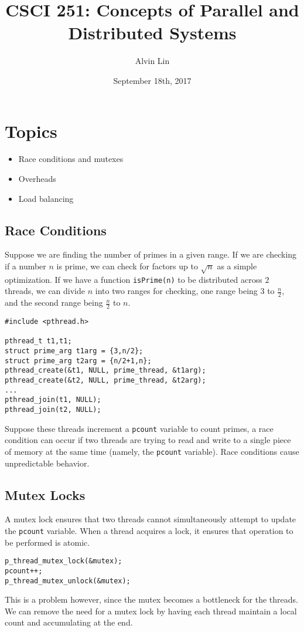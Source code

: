 \documentclass{math}
\title{CSCI 251: Concepts of Parallel and Distributed Systems}
\author{Alvin Lin}
\date{September 18th, 2017}
\begin{document}
\maketitle

\section*{Topics}
\begin{itemize}
  \item Race conditions and mutexes
  \item Overheads
  \item Load balancing
\end{itemize}

\subsection*{Race Conditions}
Suppose we are finding the number of primes in a given range. If we are
checking if a number \( n \) is prime, we can check for factors up to
\( \sqrt{n} \) as a simple optimization. If we have a function
\texttt{isPrime(n)} to be distributed across 2 threads, we can divide \( n \)
into two ranges for checking, one range being 3 to \( \frac{n}{2} \), and the
second range being \( \frac{n}{2} \) to \( n \).
\begin{lstlisting}
#include <pthread.h>

pthread_t t1,t1;
struct prime_arg t1arg = {3,n/2};
struct prime_arg t2arg = {n/2+1,n};
pthread_create(&t1, NULL, prime_thread, &t1arg);
pthread_create(&t2, NULL, prime_thread, &t2arg);
...
pthread_join(t1, NULL);
pthread_join(t2, NULL);
\end{lstlisting}
Suppose these threads increment a \texttt{pcount} variable to count primes,
a race condition can occur if two threads are trying to read and write to a
single piece of memory at the same time (namely, the \texttt{pcount} variable).
Race conditions cause unpredictable behavior.

\subsection*{Mutex Locks}
A mutex lock ensures that two threads cannot simultaneously attempt to update
the \texttt{pcount} variable. When a thread acquires a lock, it ensures that
operation to be performed is atomic.
\begin{lstlisting}
p_thread_mutex_lock(&mutex);
pcount++;
p_thread_mutex_unlock(&mutex);
\end{lstlisting}
This is a problem however, since the mutex becomes a bottleneck for the threads.
We can remove the need for a mutex lock by having each thread maintain a local
count and accumulating at the end.
\end{document}
